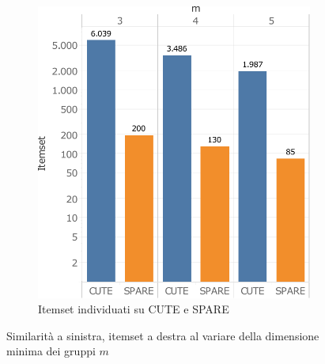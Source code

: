 \begin{figure}
\begin{subfigure}{.5\textwidth}
   \includegraphics[scale=0.6]{res/fig/sec-4/scalability/ComparisonMCUTESPARE.pdf}
  \caption{Itemset individuati su CUTE e SPARE}%
  \end{subfigure}%
  \caption{Similarità a sinistra, itemset a destra al variare della dimensione minima dei gruppi \(m\)}%
  \label{fig:chap-4:CompM}
\end{figure}

